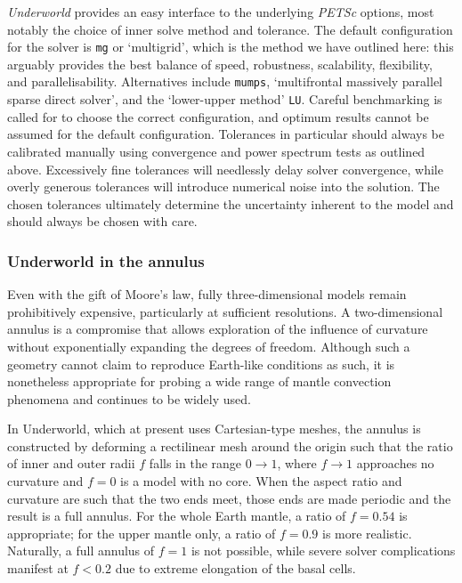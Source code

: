 \documentclass[a4paper,11pt,oneside]{book}
\begin{document}
\textit{Underworld} provides an easy interface to the underlying \textit{PETSc} options, most notably the choice of inner solve method and tolerance. The default configuration for the solver is \texttt{mg} or `multigrid', which is the method we have outlined here: this arguably provides the best balance of speed, robustness, scalability, flexibility, and parallelisability. Alternatives include \texttt{mumps}, `multifrontal massively parallel sparse direct solver', and the `lower-upper method' \texttt{LU}. Careful benchmarking is called for to choose the correct configuration, and optimum results cannot be assumed for the default configuration. Tolerances in particular should always be calibrated manually using convergence and power spectrum tests as outlined above. Excessively fine tolerances will needlessly delay solver convergence, while overly generous tolerances will introduce numerical noise into the solution. The chosen tolerances ultimately determine the uncertainty inherent to the model and should always be chosen with care.

\subsubsection{Underworld in the annulus}

Even with the gift of Moore's law, fully three-dimensional models remain prohibitively expensive, particularly at sufficient resolutions. A two-dimensional annulus is a compromise that allows exploration of the influence of curvature without exponentially expanding the degrees of freedom. Although such a geometry cannot claim to reproduce Earth-like conditions as such, it is nonetheless appropriate for probing a wide range of mantle convection phenomena and continues to be widely used.

In Underworld, which at present uses Cartesian-type meshes, the annulus is constructed by deforming a rectilinear mesh around the origin such that the ratio of inner and outer radii $f$ falls in the range $0\to1$, where $f\to1$ approaches no curvature and $f=0$ is a model with no core. When the aspect ratio and curvature are such that the two ends meet, those ends are made periodic and the result is a full annulus. For the whole Earth mantle, a ratio of $f=0.54$ is appropriate; for the upper mantle only, a ratio of $f = 0.9$ is more realistic. Naturally, a full annulus of $f=1$ is not possible, while severe solver complications manifest at $f<0.2$ due to extreme elongation of the basal cells.
\end{document}
